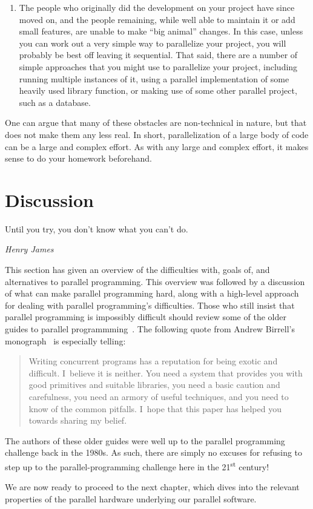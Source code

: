 {\begin{enumerate}
		development practices than are sequential environments.
		You may be well-served to clean up the existing design
		and code prior to attempting parallelization.
	\item	The people who originally did the development on your
		project have since moved on, and the people remaining,
		while well able to maintain it or add small features,
		are unable to make ``big animal'' changes.
		In this case, unless you can work out a very simple
		way to parallelize your project, you will probably
		be best off leaving it sequential.
		That said, there are a number of simple approaches that
		you might use
		to parallelize your project, including running multiple
		instances of it, using a parallel implementation of
		some heavily used library function, or making use of
		some other parallel project, such as a database.
	\end{enumerate}

	One can argue that many of these obstacles are non-technical
	in nature, but that does not make them any less real.
	In short, parallelization of a large body of code
	can be a large and complex effort.
	As with any large and complex effort, it makes sense to
	do your homework beforehand.
}\QuickQuizEnd

\section{Discussion}
\label{sec:intro:Discussion}
%
\epigraph{Until you try, you don't know what you can't do.}
	 {\emph{Henry James}}

This section has given an overview of the difficulties with, goals of,
and alternatives to parallel programming.
This overview was followed by a discussion of
what can make parallel programming hard, along with a high-level
approach for dealing with parallel programming's difficulties.
Those who still insist that parallel programming is impossibly difficult
should review some of the older guides to parallel
programmming~\cite{SQNTParallel,AndrewDBirrell1989Threads,Beck85,Inman85}.
The following quote from Andrew Birrell's
monograph~\cite{AndrewDBirrell1989Threads} is especially telling:

\begin{quote}
	Writing concurrent programs has a reputation for being exotic
	and difficult. I~believe it is neither. You need a system
	that provides you with good primitives and suitable libraries,
	you need a basic caution and carefulness, you need an armory of
	useful techniques, and you need to know of the common pitfalls.
	I~hope that this paper has helped you towards sharing my belief.
\end{quote}

The authors of these older guides were well up to the parallel programming
challenge back in the 1980s.
As such, there are simply no excuses for refusing to step up to the
parallel-programming challenge here in the 21\textsuperscript{st} century!

We are now ready to proceed to the next chapter, which dives into the
relevant properties of the parallel hardware underlying our parallel
software.

